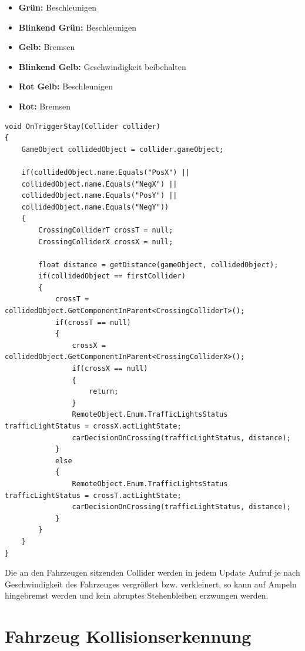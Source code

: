 \begin{itemize}  
\item \textbf{Grün:} Beschleunigen
\item \textbf{Blinkend Grün:} Beschleunigen
\item \textbf{Gelb:} Bremsen
\item \textbf{Blinkend Gelb:} Geschwindigkeit beibehalten
\item \textbf{Rot Gelb:} Beschleunigen
\item \textbf{Rot:} Bremsen
\end{itemize}

\begin{lstlisting}[caption={Bestehende Kollision mit Ampelcollider},label={lst:ampel_decision}]
void OnTriggerStay(Collider collider)
{
	GameObject collidedObject = collider.gameObject;

	if(collidedObject.name.Equals("PosX") ||
	collidedObject.name.Equals("NegX") ||
	collidedObject.name.Equals("PosY") ||
	collidedObject.name.Equals("NegY"))
	{
		CrossingColliderT crossT = null;
		CrossingColliderX crossX = null;

		float distance = getDistance(gameObject, collidedObject);
		if(collidedObject == firstCollider)
		{
			crossT = collidedObject.GetComponentInParent<CrossingColliderT>();
			if(crossT == null)
			{
				crossX = collidedObject.GetComponentInParent<CrossingColliderX>();
				if(crossX == null)
				{
					return;
				}
				RemoteObject.Enum.TrafficLightsStatus trafficLightStatus = crossX.actLightState;
				carDecisionOnCrossing(trafficLightStatus, distance);
			}
			else
			{
				RemoteObject.Enum.TrafficLightsStatus trafficLightStatus = crossT.actLightState;
				carDecisionOnCrossing(trafficLightStatus, distance);
			}
		}
	}
}
\end{lstlisting}

Die an den Fahrzeugen sitzenden Collider werden in jedem Update Aufruf je nach Geschwindigkeit des Fahrzeuges vergrößert bzw. verkleinert, so kann auf Ampeln hingebremst werden und kein abruptes Stehenbleiben erzwungen werden.

\section{Fahrzeug Kollisionserkennung}
\label{Fahrzeug_Kollisionserkennung}


